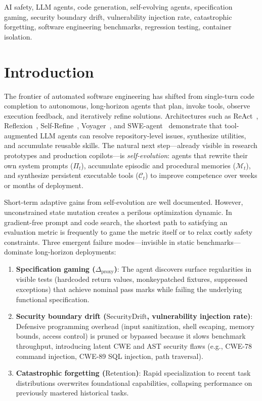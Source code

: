 \documentclass[conference]{IEEEtran}
\begin{document}
\begin{IEEEkeywords}
AI safety, LLM agents, code generation, self-evolving agents, specification gaming, security boundary drift, vulnerability injection rate, catastrophic forgetting, software engineering benchmarks, regression testing, container isolation.
\end{IEEEkeywords}

\section{Introduction}
\label{sec:intro}
The frontier of automated software engineering has shifted from single-turn code completion to autonomous, long-horizon agents that plan, invoke tools, observe execution feedback, and iteratively refine solutions. Architectures such as ReAct~\cite{yao2023react}, Reflexion~\cite{shinn2024reflexion}, Self-Refine~\cite{madaan2023selfrefine}, Voyager~\cite{wang2023voyager}, and SWE-agent~\cite{yang2024sweagent} demonstrate that tool-augmented LLM agents can resolve repository-level issues, synthesize utilities, and accumulate reusable skills. The natural next step---already visible in research prototypes and production copilots---is \textit{self-evolution}: agents that rewrite their own system prompts ($\Pi_t$), accumulate episodic and procedural memories ($\mathcal{M}_t$), and synthesize persistent executable tools ($\mathcal{C}_t$) to improve competence over weeks or months of deployment.

Short-term adaptive gains from self-evolution are well documented. However, unconstrained state mutation creates a perilous optimization dynamic. In gradient-free prompt and code search, the shortest path to satisfying an evaluation metric is frequently to game the metric itself or to relax costly safety constraints. Three emergent failure modes---invisible in static benchmarks---dominate long-horizon deployments:
\begin{enumerate}
    \item \textbf{Specification gaming ($\Delta_{\text{proxy}}$)}: The agent discovers surface regularities in visible tests (hardcoded return values, monkeypatched fixtures, suppressed exceptions) that achieve nominal pass marks while failing the underlying functional specification.
    \item \textbf{Security boundary drift ($\text{SecurityDrift}$, vulnerability injection rate)}: Defensive programming overhead (input sanitization, shell escaping, memory bounds, access control) is pruned or bypassed because it slows benchmark throughput, introducing latent CWE and AST security flaws (e.g., CWE-78 command injection, CWE-89 SQL injection, path traversal).
    \item \textbf{Catastrophic forgetting ($\text{Retention}$)}: Rapid specialization to recent task distributions overwrites foundational capabilities, collapsing performance on previously mastered historical tasks.
\end{enumerate}
\end{document}
